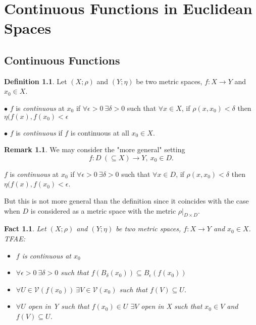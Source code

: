 \documentclass[12pt]{amsbook}
\newtheorem{fact}[theorem]{Fact}
\theoremstyle{definition}
\newtheorem{definition}[theorem]{Definition}
\newtheorem{remark}[theorem]{Remark}
\newcommand{\cV}{{\mathcal V}}
\newcommand{\ra}{\rightarrow} %
\begin{document}
\chapter{Continuous Functions in Euclidean Spaces}

\section{Continuous Functions}


\begin{definition} 
Let $(X; \rho)$ and $(Y; \eta)$ be two metric spaces, $f: X \ra Y$ and $x_0 \in X$.

$\bullet$ $f$ is \emph{continuous} at $x_0$ if $\forall \epsilon > 0 \ \exists \delta > 0$ such that $\forall x \in X$, if $\rho(x, x_0) < \delta$ then $\eta(f(x), f(x_0) < \epsilon$

$\bullet$ $f$ is \emph{continuous} if $f$ is continuous at all $x_0 \in X$.
\end{definition}

\begin{remark}
We may consider the "more general" setting \begin{equation*} f: D \ (\subseteq X) \ra Y, \ x_0 \in D. \end{equation*}

$f$ is \emph{continuous} at $x_0$ if $\forall \epsilon > 0 \ \exists \delta > 0$ such that $\forall x \in D$, if $\rho(x, x_0) < \delta$ then $\eta(f(x), f(x_0) < \epsilon$. 

But this is not more general than the definition since it coincides with the case when $D$ is considered as a metric space with the metric $\rho|_{D \times D}$.
\end{remark}

\begin{fact}
Let $(X; \rho)$ and $(Y; \eta)$ be two metric spaces, $f: X \ra Y$ and $x_0 \in X$. TFAE:

\begin{itemize}
\item[(i)] $f$ is continuous at $x_0$
\item[(ii)] $\forall \epsilon > 0 \ \exists \delta > 0$ such that $f(B_\delta(x_0)) \subseteq B_\epsilon(f(x_0))$
\item[(iii)] $\forall U \in \cV(f(x_0)) \ \exists V \in \cV(x_0)$ such that $f(V) \subseteq U$.
\item[(iv)] $\forall U$ open in Y such that $f(x_0) \in U$ $\exists V$ open in X such that $x_0 \in V$ and $f(V) \subseteq U$.
\end{itemize}
\end{fact}
\end{document}
